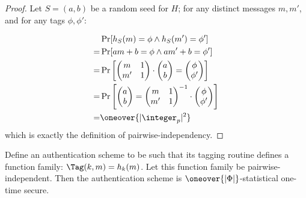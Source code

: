\begin{proof}
    Let $S = (a, b)$ be a random seed for $H$; for any distinct messages $m, m'$, and for any tags $\phi, \phi'$:

    \begin{align*}
        & \Pr[h_S(m) = \phi \wedge h_S(m') = \phi'] \\
        =& \Pr[am + b = \phi \wedge am' + b = \phi'] \\
        =& \Pr\left[
        \begin{pmatrix}
            m & 1 \\
            m' & 1
        \end{pmatrix}
        \cdot
        \begin{pmatrix}
            a \\
            b
        \end{pmatrix}
        =
        \begin{pmatrix}
            \phi \\
            \phi'
        \end{pmatrix}
        \right] \\
        =& \Pr\left[
        \begin{pmatrix}
            a \\
            b
        \end{pmatrix}
        =
        \begin{pmatrix}
            m & 1 \\
            m' & 1
        \end{pmatrix}^{-1}
        \cdot
        \begin{pmatrix}
            \phi \\
            \phi'
        \end{pmatrix}
        \right] \\
        =& \oneover{|\integer_p|^2}
    \end{align*}
    which is exactly the definition of pairwise-independency.
\end{proof}

\begin{theorem}
    Define an authentication scheme to be such that its tagging routine defines a function family: $\Tag(k, m)=h_k(m)$. Let this function family be pairwise-independent. Then the authentication scheme is $\oneover{|\Phi|}$-statistical one-time secure. 
\end{theorem}

